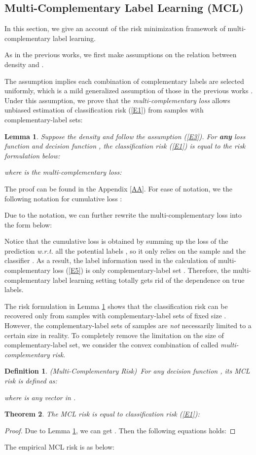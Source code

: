 \documentclass[]{article} \usepackage{geometry}
\newtheorem{definition}{Definition}
\newtheorem{theorem}{Theorem}
\newtheorem{lemma}[theorem]{Lemma}
\begin{document}
\subsection{Multi-Complementary Label Learning (MCL)}
In this section, we give an account of the risk minimization framework of multi-complementary label learning.

As in the previous works, we first make assumptions on the relation between density  and .


The assumption implies each combination of  complementary labels are selected uniformly, which is a mild generalized assumption of those in the previous works \cite{DBLP:conf/nips/IshidaNHS17,DBLP:conf/eccv/YuLGT18,DBLP:conf/icml/IshidaNMS19}. Under this assumption, we prove that the \textit{multi-complementary loss} allows unbiased estimation of classification risk (\ref{E1}) from samples with complementary-label sets:
\begin{lemma}
\label{T1}Suppose the density  and  follow the assumption (\ref{E3}). For \textbf{any} loss function  and decision function , the classification risk (\ref{E1}) is equal to the risk formulation below:

where  is the multi-complementary loss:

\end{lemma}
The proof can be found in the Appendix \ref{AA}. For ease of notation, we the following notation for cumulative loss :

Due to the notation, we can further rewrite the multi-complementary loss into the form below:

Notice that the cumulative loss  is obtained by summing up the loss of the prediction  \textit{w.r.t.} all the potential labels , so it only relies on the sample  and the classifier . As a result, the label information used in the calculation of multi-complementary loss (\ref{E5}) is only complementary-label set . Therefore, the multi-complementary label learning setting totally gets rid of the dependence on true labels.

The risk formulation in Lemma \ref{T1} shows that the classification risk can be recovered only from samples with complementary-label sets of fixed size . However, the complementary-label sets of samples are \textit{not} necessarily limited to a certain size in reality. To completely remove the limitation on the size of complementary-label set, we consider the convex combination of  called \textit{multi-complementary risk}.
\begin{definition}\label{D1}(Multi-Complementary Risk)~For any decision function , its MCL risk is defined as:

where  is any vector in .
\end{definition}
\begin{theorem}
The MCL risk is equal to classification risk (\ref{E1}):

\end{theorem}
\begin{proof}
Due to Lemma \ref{T1}, we can get . Then the following equations holds:
\end{proof}
The empirical MCL risk is as below:
\end{document}
